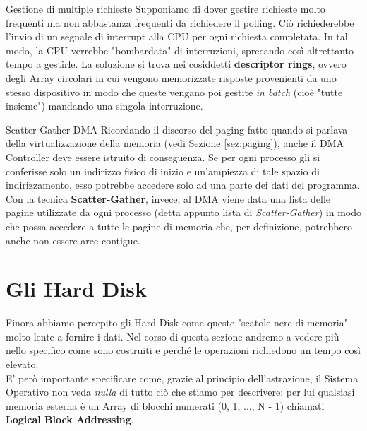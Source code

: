 \documentclass[12pt]{report}
\begin{document}
	\begin{osservazione}{Gestione di multiple richieste}{}
		Supponiamo di dover gestire richieste molto frequenti ma non abbastanza frequenti da richiedere il polling. Ciò richiederebbe l'invio di un segnale di interrupt alla CPU per ogni richiesta completata. In tal modo, la CPU verrebbe "bombardata" di interruzioni, sprecando così altrettanto tempo a gestirle. La soluzione si trova nei cosiddetti \textbf{descriptor rings}, ovvero degli Array circolari in cui vengono memorizzate risposte provenienti da uno stesso dispositivo in modo che queste vengano poi gestite \textit{in batch} (cioè "tutte insieme") mandando una singola interruzione.
	\end{osservazione}
	
	\begin{proposizione}{Scatter-Gather DMA}{}
		Ricordando il discorso del paging fatto quando si parlava della virtualizzazione della memoria (vedi Sezione \ref{sez:paging}), anche il DMA Controller deve essere istruito di conseguenza. Se per ogni processo gli si conferisse solo un indirizzo fisico di inizio e un'ampiezza di tale spazio di indirizzamento, esso potrebbe accedere solo ad una parte dei dati del programma. Con la tecnica \textbf{Scatter-Gather}, invece, al DMA viene data una lista delle pagine utilizzate da ogni processo (detta appunto lista di \textit{Scatter-Gather}) in modo che possa accedere a tutte le pagine di memoria che, per definizione, potrebbero anche non essere aree contigue.
	\end{proposizione}
	
	\section{Gli Hard Disk}
	Finora abbiamo percepito gli Hard-Disk come queste "scatole nere di memoria" molto lente a fornire i dati. Nel corso di questa sezione andremo a vedere più nello specifico come sono costruiti e perché le operazioni richiedono un tempo così elevato.\\
	E' però importante specificare come, grazie al principio dell'astrazione, il Sistema Operativo non veda \textit{nulla} di tutto ciò che stiamo per descrivere: per lui qualsiasi memoria esterna è un Array di blocchi numerati (0, 1, ..., N - 1) chiamati \textbf{Logical Block Addressing}.
	
\end{document}
